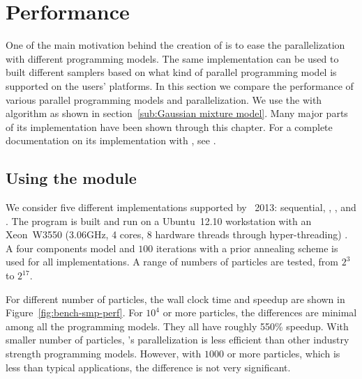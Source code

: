 \section{Performance}
\label{sec:vSMC Performance}

One of the main motivation behind the creation of \vsmc is to ease the
parallelization with different programming models. The same implementation can
be used to built different samplers based on what kind of parallel programming
model is supported on the users' platforms. In this section we compare the
performance of various \smp parallel programming models and \opencl
parallelization. We use the \gmm with \smc[2] algorithm as shown in
section~\ref{sub:Gaussian mixture model}. Many major parts of its
implementation have been shown through this chapter. For a complete
documentation on its implementation with \vsmc, see \cite{vsmcjss}.

\subsection{Using the \protect\smp module}
\label{sub:Using the SMP module}

We consider five different implementations supported by \icpc~2013:
sequential, \tbb, \cilk, \openmp and \cppoo{} . The
program is built and run on a Ubuntu~12.10 workstation with an Xeon~W3550
(3.06GHz, 4 cores, 8 hardware threads through hyper-threading) \cpu. A four
components model and $100$ iterations with a prior annealing scheme is used
for all implementations. A range of numbers of particles are tested, from
$2^3$ to $2^{17}$.

For different number of particles, the wall clock time and speedup are shown
in Figure~\ref{fig:bench-smp-perf}. For $10^4$ or more particles, the
differences are minimal among all the programming models. They all have
roughly 550\% speedup. With smaller number of particles, \vsmc's \cppoo
parallelization is less efficient than other industry strength programming
models. However, with $1000$ or more particles, which is less than typical
applications, the difference is not very significant.

